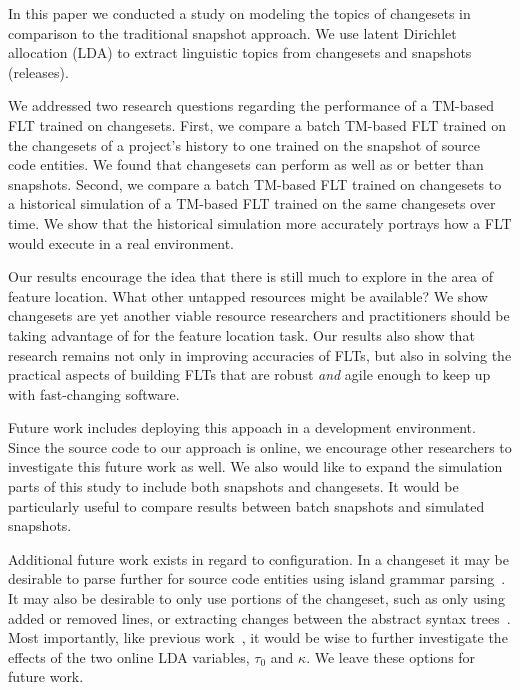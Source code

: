 
In this paper we conducted a study on modeling the topics of changesets in
comparison to the traditional snapshot approach.  We use latent Dirichlet
allocation (LDA) to extract linguistic topics from changesets and snapshots
(releases).

We addressed two research questions regarding the performance of a TM-based FLT
trained on changesets.  First, we compare a batch TM-based FLT trained on the
changesets of a project's history to one trained on the snapshot of source code
entities.  We found that changesets can perform as well as or better than
snapshots.  Second, we compare a batch TM-based FLT trained on changesets to
a historical simulation of a TM-based FLT trained on the same changesets over
time.  We show that the historical simulation more accurately portrays how a FLT
would execute in a real environment.

Our results encourage the idea that there is still much to explore in the area
of feature location. What other untapped resources might be available? We show
changesets are yet another viable resource researchers and practitioners should
be taking advantage of for the feature location task.  Our results also show
that research remains not only in improving accuracies of FLTs, but also in
solving the practical aspects of building FLTs that are robust \emph{and} agile
enough to keep up with fast-changing software.

Future work includes deploying this appoach in a development environment.  Since
the source code to our approach is online, we encourage other researchers to
investigate this future work as well.  We also would like to expand the simulation 
parts of this study to include both snapshots and changesets.  It would be
particularly useful to compare results between batch snapshots and simulated
snapshots. 

Additional future work exists in regard to configuration. In a changeset
it may be desirable to parse further for source code entities using
island grammar parsing~\cite{Moonen_2001}.  It may also be desirable to
only use portions of the changeset, such as only using added or removed
lines, or extracting changes between the abstract syntax
trees~\cite{Fluri-etal_2007}. Most importantly, like previous
work~\cite{Biggers-etal_2014}, it would be wise to further investigate
the effects of the two online LDA variables, $\tau_0$ and $\kappa$.  We
leave these options for future work.

